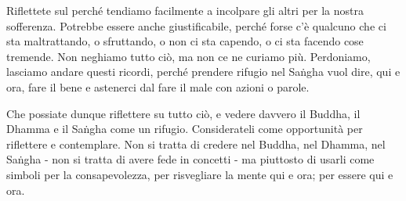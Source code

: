 Riflettete sul perché tendiamo facilmente a incolpare gli altri per la
nostra sofferenza. Potrebbe essere anche giustificabile, perché forse
c'è qualcuno che ci sta maltrattando, o sfruttando, o non ci sta
capendo, o ci sta facendo cose tremende. Non neghiamo tutto ciò, ma non
ce ne curiamo più. Perdoniamo, lasciamo andare questi ricordi, perché
prendere rifugio nel Saṅgha vuol dire, qui e ora, fare il bene e
astenerci dal fare il male con azioni o parole.

Che possiate dunque riflettere su tutto ciò, e vedere davvero il Buddha,
il Dhamma e il Saṅgha come un rifugio. Considerateli come opportunità
per riflettere e contemplare. Non si tratta di credere nel Buddha, nel
Dhamma, nel Saṅgha - non si tratta di avere fede in concetti - ma
piuttosto di usarli come simboli per la consapevolezza, per risvegliare
la mente qui e ora; per essere qui e ora.
